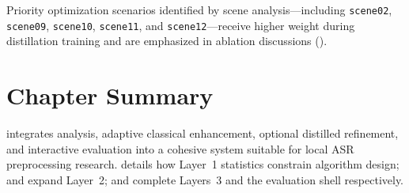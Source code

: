 Priority optimization scenarios identified by scene analysis---including \texttt{scene02}, \texttt{scene09}, \texttt{scene10}, \texttt{scene11}, and \texttt{scene12}---receive higher weight during distillation training and are emphasized in ablation discussions ().

\section{Chapter Summary}
\label{sec:system_summary}

\projectshort{} integrates analysis, adaptive classical enhancement, optional distilled refinement, and interactive evaluation into a cohesive system suitable for local ASR preprocessing research.  details how Layer~1 statistics constrain algorithm design;  and  expand Layer~2;  and  complete Layers~3 and the evaluation shell respectively.
